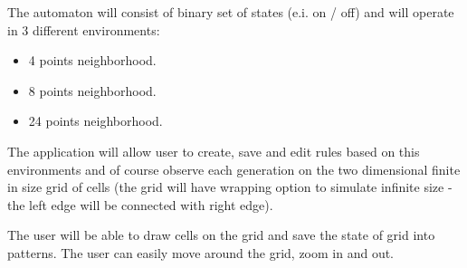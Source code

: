 \documentclass{article}
\begin{document}
\hspace{15pt} The automaton will consist of binary set of states 
(e.i. on / off) and will operate in 3 different environments:
\begin{itemize}
	\item 4 points neighborhood.
	\item 8 points neighborhood.
	\item 24 points neighborhood.
\end{itemize}

\par The application will allow user to create, save and edit rules based on this environments and of course observe each generation on the two dimensional finite in size grid of cells
(the grid will have wrapping option to simulate infinite size - the left edge will be connected with right edge).

\par The user will be able to draw cells on the grid and save the state of grid into patterns.
The user can easily move around the grid, zoom in and out.
\end{document}
